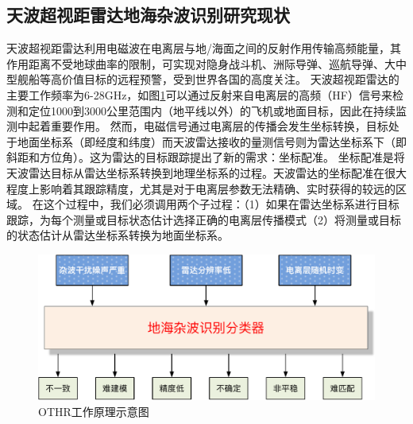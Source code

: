 \subsection{天波超视距雷达地海杂波识别研究现状}
天波超视距雷达利用电磁波在电离层与地/海面之间的反射作用传输高频能量，其作用距离不受地球曲率的限制，可实现对隐身战斗机、洲际导弹、巡航导弹、大中型舰船等高价值目标的远程预警，受到世界各国的高度关注。
天波超视距雷达的主要工作频率为6-28GHz，如图\ref{fig:othr_how}可以通过反射来自电离层的高频（HF）信号来检测和定位1000到3000公里范围内（地平线以外）的飞机或地面目标，因此在持续监测中起着重要作用\cite{headrick1974over, fabrizio2013high}。
然而，电磁信号通过电离层的传播会发生坐标转换，目标处于地面坐标系（即经度和纬度）而天波雷达接收的量测信号则为雷达坐标系下（即斜距和方位角）\cite{krolik1997maximum}。这为雷达的目标跟踪提出了新的需求：坐标配准。
坐标配准是将天波雷达目标从雷达坐标系转换到地理坐标系的过程。天波雷达的坐标配准在很大程度上影响着其跟踪精度，尤其是对于电离层参数无法精确、实时获得的较远的区域。
在这个过程中，我们必须调用两个子过程：（1）如果在雷达坐标系进行目标跟踪，为每个测量或目标状态估计选择正确的电离层传播模式（2）将测量或目标的状态估计从雷达坐标系转换为地面坐标系。
\begin{figure}[H]
	\centering
	\includegraphics[width=\textwidth]{figures/othr/othr_classification}
	\caption{OTHR工作原理示意图}
	\label{fig:othr_how}
\end{figure}

